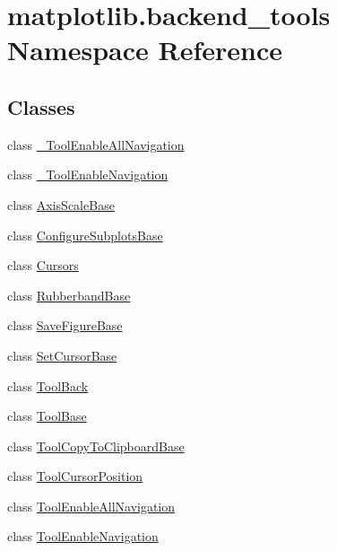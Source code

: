 \hypertarget{namespacematplotlib_1_1backend__tools}{}\section{matplotlib.\+backend\+\_\+tools Namespace Reference}
\label{namespacematplotlib_1_1backend__tools}
\subsection*{Classes}
\begin{DoxyCompactItemize}
\item 
class \hyperlink{classmatplotlib_1_1backend__tools_1_1__ToolEnableAllNavigation}{\+\_\+\+Tool\+Enable\+All\+Navigation}
\item 
class \hyperlink{classmatplotlib_1_1backend__tools_1_1__ToolEnableNavigation}{\+\_\+\+Tool\+Enable\+Navigation}
\item 
class \hyperlink{classmatplotlib_1_1backend__tools_1_1AxisScaleBase}{Axis\+Scale\+Base}
\item 
class \hyperlink{classmatplotlib_1_1backend__tools_1_1ConfigureSubplotsBase}{Configure\+Subplots\+Base}
\item 
class \hyperlink{classmatplotlib_1_1backend__tools_1_1Cursors}{Cursors}
\item 
class \hyperlink{classmatplotlib_1_1backend__tools_1_1RubberbandBase}{Rubberband\+Base}
\item 
class \hyperlink{classmatplotlib_1_1backend__tools_1_1SaveFigureBase}{Save\+Figure\+Base}
\item 
class \hyperlink{classmatplotlib_1_1backend__tools_1_1SetCursorBase}{Set\+Cursor\+Base}
\item 
class \hyperlink{classmatplotlib_1_1backend__tools_1_1ToolBack}{Tool\+Back}
\item 
class \hyperlink{classmatplotlib_1_1backend__tools_1_1ToolBase}{Tool\+Base}
\item 
class \hyperlink{classmatplotlib_1_1backend__tools_1_1ToolCopyToClipboardBase}{Tool\+Copy\+To\+Clipboard\+Base}
\item 
class \hyperlink{classmatplotlib_1_1backend__tools_1_1ToolCursorPosition}{Tool\+Cursor\+Position}
\item 
class \hyperlink{classmatplotlib_1_1backend__tools_1_1ToolEnableAllNavigation}{Tool\+Enable\+All\+Navigation}
\item 
class \hyperlink{classmatplotlib_1_1backend__tools_1_1ToolEnableNavigation}{Tool\+Enable\+Navigation}

\end{DoxyCompactItemize}
